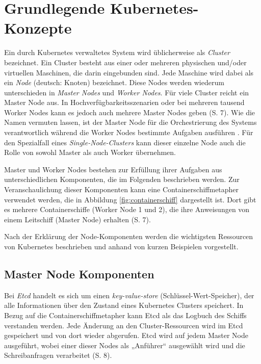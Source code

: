 \documentclass[11pt,a4paper]{article}
\begin{document}
\section{Grundlegende Kubernetes-Konzepte}
\label{sec:Grundlegende_Kubernetes-Konzepte}
Ein durch Kubernetes verwaltetes System wird üblicherweise als \emph{Cluster} bezeichnet.
Ein Cluster besteht aus einer oder mehreren physischen und/oder virtuellen Maschinen, die darin eingebunden sind.
Jede Maschine wird dabei als ein \emph{Node} (deutsch: Knoten) bezeichnet. Diese Nodes werden wiederum unterschieden in
\emph{Master Nodes} und \emph{Worker Nodes}.
Für viele Cluster reicht ein Master Node aus. In Hochverfügbarkeitsszenarien oder bei mehreren
tausend Worker Nodes kann es jedoch auch mehrere Master Nodes geben \cite{Schmeling_Dargatz_2022} (S. 7).
Wie die Namen vermuten lassen, ist der Master Node für die Orchestrierung
des Systems verantwortlich während die Worker Nodes bestimmte Aufgaben ausführen \cite{Bentaleb_Belloum_Sebaa_El-Maouhab_2021}.
Für den Spezialfall eines \emph{Single-Node-Clusters} kann dieser einzelne Node auch die Rolle von sowohl
Master als auch Worker übernehmen.

Master und Worker Nodes bestehen zur Erfüllung ihrer Aufgaben aus unterschiedlichen Komponenten,
die im Folgenden beschrieben werden.
Zur Veranschaulichung dieser Komponenten kann eine Containerschiffmetapher verwendet werden,
die in Abbildung \ref{fig:containerschiff} dargestellt ist. Dort gibt es mehrere Containerschiffe
(Worker Node 1 und 2), die ihre Anweisungen von einem Leitschiff (Master Node) erhalten \cite{Schmeling_Dargatz_2022} (S. 7).

Nach der Erklärung der Node-Komponenten werden die wichtigsten Ressourcen
von Kubernetes beschrieben und anhand von kurzen Beispielen vorgestellt.


\subsection{Master Node Komponenten}
\label{sec:MasterNodeKomponenten}
Bei \emph{Etcd} handelt es sich um einen \emph{key-value-store} (Schlüssel-Wert-Speicher),
der alle Informationen über den Zustand eines Kubernetes Clusters speichert.
In Bezug auf die Containerschiffmetapher kann Etcd als das Logbuch des Schiffs verstanden werden.
Jede Änderung an den Cluster-Ressourcen wird im Etcd gespeichert und von dort wieder abgerufen.
Etcd wird auf jedem Master Node ausgeführt, wobei einer dieser Nodes als „Anführer“
ausgewählt wird und die Schreibanfragen verarbeitet \cite{Schmeling_Dargatz_2022} (S. 8).
\end{document}
